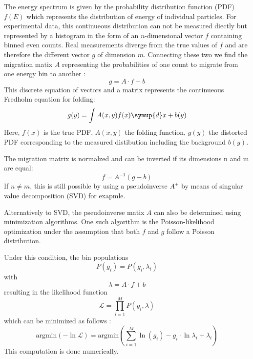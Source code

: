     The energy spectrum is given by the probability distribution function (PDF) $f(E)$ which represents the distribution of energy of individual particles.
    For experimental data, this continueous distribution can not be measured diectly but represented by a histogram in the form of an $n$-dimensional vector $f$ containing binned even counts.
    Real measurements diverge from the true values of $f$ and are therefore the different vector $g$ of dimension $m$.
    Connecting these two we find the migration matix $A$ representing the probabilities of one count to migrate from one energy bin to another \cite{FACTManual}:
    \begin{equation}
        g = A \cdot f + b
        \label{eqn:folding}
    \end{equation} 
    This discrete equation of vectors and a matrix represents the continueous Fredholm equation \cite{FACTManual} for folding:
    \begin{equation}
        g(y)= \int A(x,y)f(x) \symup{d}x + b(y)
    \end{equation}
    Here, $f(x)$ is the true PDF, $A(x,y)$ the folding function, $g(y)$ the distorted PDF corresponding to the measured distibution including the background $b(y)$.

    The migration matrix is normalzed and can be inverted if its dimensions n and m are equal:
    \begin{equation}
        f = A^{-1}(g-b)
        \label{eqn:unfolding}
    \end{equation}
    If $n \neq m$, this is still possible by using a pseudoinverse $A^{+}$ by means of singular value decomposition (SVD) for exapmle.
   
    Alternatively to SVD, the pseudoinverse matix $A$ can also be determined using minimization algorithms.
    One such algorithm is the Poisson-likelihood optimization under the assumption that both $f$ and $g$ follow a Poisson distribution.

    Under this condition, the bin populations 
    \begin{equation}
        P(g_i) = P(g_i,\lambda_i)
    \end{equation}
    with 
    \begin{equation}
        \lambda = A \cdot f + b
    \end{equation}
    resulting in the likelihood function
    \begin{equation}
        \mathcal{L} = \prod_{i=1}^M P(g_i,\lambda)
    \end{equation}
    which can be minimized as follows \cite{FACTManual}:
    \begin{equation}
        \text{argmin}(- \ln \mathcal{L})=\text{argmin}\left(\sum_{i=1}^M \ln(g_i \!)-g_i \cdot \ln\lambda_i+\lambda_i\right)
        \label{eq:PoissonLikelihood}
    \end{equation}
    This computation is done numerically.

